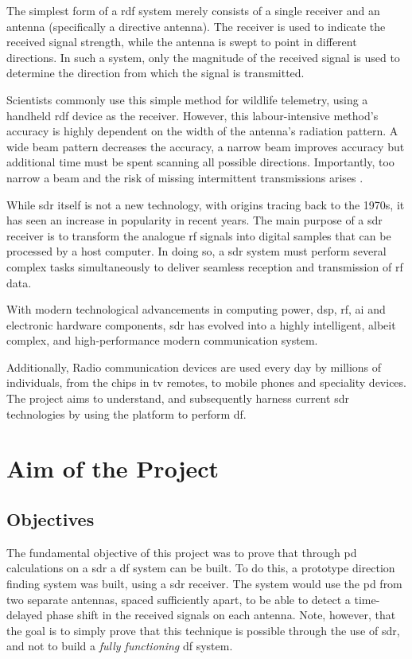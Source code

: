 \documentclass[class=report,11pt,crop=false]{standalone}
\begin{document}
The simplest form of a \gls{rdf} system merely consists of a single receiver and an antenna (specifically a directive antenna). The receiver is used to indicate the received signal strength, while the antenna is swept to point in different directions. In such a system, only the magnitude of the received signal is used to determine the direction from which the signal is transmitted.

Scientists commonly use this simple method for wildlife telemetry, using a handheld \gls{rdf} device as the receiver. However, this labour-intensive method's accuracy is highly dependent on the width of the antenna's radiation pattern. A wide beam pattern decreases the accuracy, a narrow beam improves accuracy but additional time must be spent scanning all possible directions. Importantly, too narrow a beam and the risk of missing intermittent transmissions arises \cite{telem-issues}. 

While \gls{sdr} itself is not a new technology, with origins tracing back to the 1970s, it has seen an increase in popularity in recent years. The main purpose of a \gls{sdr} receiver is to transform the analogue \gls{rf} signals into digital samples that can be processed by a host computer. In doing so, a \gls{sdr} system must perform several complex tasks simultaneously to deliver seamless reception and transmission of \gls{rf} data.

With modern technological advancements in computing power, \gls{dsp}, \gls{rf}, \gls{ai} and electronic hardware components, \gls{sdr} has evolved into a highly intelligent, albeit complex, and high-performance modern communication system. \cite{sdr-for-engineers}

Additionally, Radio communication devices are used every day by millions of individuals, from the chips in \gls{tv} remotes, to mobile phones and speciality devices. The project aims to understand, and subsequently harness current \gls{sdr} technologies by using the platform to perform \gls{df}.

\section{Aim of the Project}


\subsection{Objectives}
The fundamental objective of this project was to prove that through \gls{pd} calculations on a \gls{sdr} a \gls{df} system can be built. To do this, a prototype direction finding system was built, using a \gls{sdr} receiver. The system would use the \gls{pd} from two separate antennas, spaced sufficiently apart, to be able to detect a time-delayed phase shift in the received signals on each antenna. Note, however, that the goal is to simply prove that this technique is possible through the use of \gls{sdr}, and not to build a \emph{fully functioning} \gls{df} system.
\end{document}
